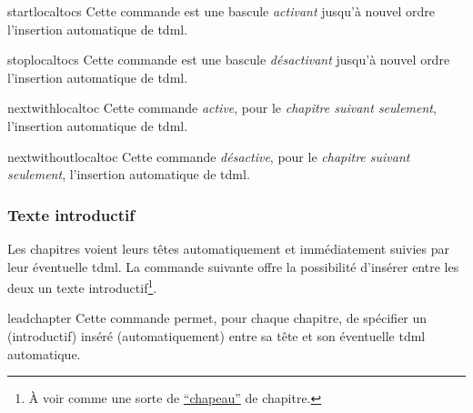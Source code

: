 \begin{docCommand}[doc new=2016-10-30]{startlocaltocs}{}
  Cette commande est une bascule \emph{activant} jusqu'à nouvel ordre
  l'insertion automatique de \gls{tdml}.
\end{docCommand}

\begin{docCommand}[doc new=2016-10-30]{stoplocaltocs}{}
  Cette commande est une bascule \emph{désactivant} jusqu'à nouvel ordre
  l'insertion automatique de \gls{tdml}.
\end{docCommand}

\begin{docCommand}[doc new=2016-10-30]{nextwithlocaltoc}{}
  Cette commande \emph{active}, pour le \emph{chapitre suivant seulement},
  l'insertion automatique de \gls{tdml}.
\end{docCommand}

\begin{docCommand}[doc new=2016-10-30]{nextwithoutlocaltoc}{}
  Cette commande \emph{désactive}, pour le \emph{chapitre suivant seulement},
  l'insertion automatique de \gls{tdml}.
\end{docCommand}

\subsubsection{Texte introductif}
\label{sec:texte-introductif}

%

Les chapitres voient leurs têtes automatiquement et immédiatement suivies par
leur éventuelle \gls{tdml}. La commande  suivante offre la
possibilité d'insérer entre les deux un texte introductif\footnote{À voir comme
  une sorte de
  \href{https://fr.wikipedia.org/wiki/Chapeau_(presse)}{\enquote{chapeau}} de chapitre.}.

\begin{docCommand}[doc new=2021-03-23]{leadchapter}{}
  Cette commande permet, pour chaque chapitre, de spécifier un 
  (introductif) inséré (automatiquement) entre sa tête et son éventuelle
  \gls{tdml} automatique.
\end{docCommand}

